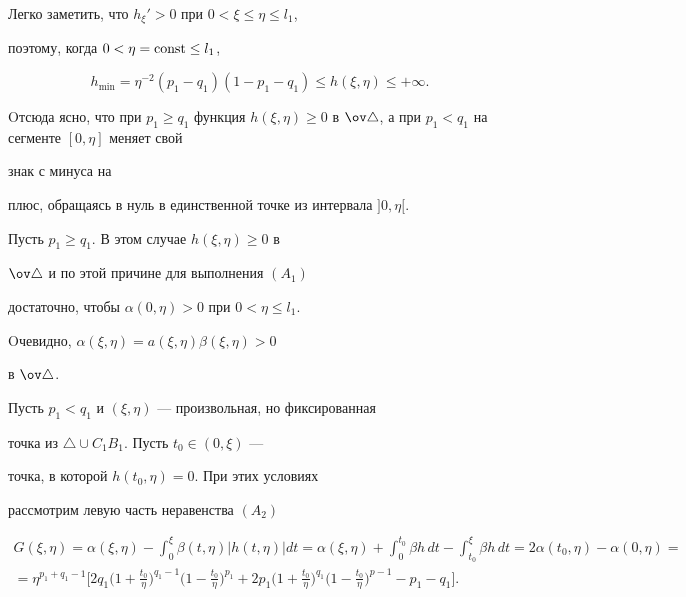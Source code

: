 Легко заметить, что $h_{\xi}'>0 $ при $0<\xi \le \eta \le l_1$, 


поэтому, когда $0<\eta=\operatorname{const}\le l_1$,


$$


h_{\min}=\eta^{-2}(p_1-q_1)(1-p_1-q_1)\le h(\xi,\eta)\le +\infty.


$$


Oтсюда ясно, что при $p_1\ge q_1$ функция $h(\xi,\eta)\ge 0$ в $\ov 


\triangle$, а при $p_1<q_1$ на сегменте $[0,\eta]$ меняет свой 


знак с минуса на 


плюс, обращаясь в нуль в единственной точке из интервала $]0,\eta[$.





Пусть $p_1\ge q_1$. В этом случае $h(\xi,\eta)\ge 0$ в 


$\ov \triangle $ и по этой причине для выполнения $(A_1)$ 


достаточно, чтобы $\alpha (0,\eta)>0 $ при $ 0<\eta \le l_1$.


Oчевидно, $\alpha (\xi,\eta)=a(\xi,\eta)\beta (\xi ,\eta)>0$


в $\ov \triangle$.





Пусть $p_1<q_1$ и $(\xi,\eta)$ --- произвольная, но фиксированная 


точка из $\triangle \cup C_{1}B_{1}$. Пусть $t_0\in (0,\xi)$ ---


точка, в которой $h(t_0,\eta)=0$. При этих условиях 


рассмотрим левую часть неравенства $(A_2)$


\begin{multline*}


G(\xi,\eta)=\alpha (\xi,\eta)-\int_0^{\xi }\beta 


(t,\eta)| h(t,\eta)| dt=\alpha (\xi,\eta)+\int_0^{t_0}\beta h\,dt-


\int_{t_0}^{\xi }\beta h\,dt=


2\alpha (t_0,\eta)-\alpha (0,\eta)= \\


%


=\eta^{p_1+q_1-1}\bigg[2q_1\bigg(1+\frac{t_0}{\eta}


\bigg)^{q_1-1}\bigg(1-\frac{t_0}{\eta}


\bigg)^{p_1}+


2p_1\bigg(1+\frac{t_0}{\eta }\bigg)^{q_1}\bigg(1-


\frac{t_0}{\eta }\bigg)^{p-1}-p_1-q_1\bigg].


\end{multline*}


